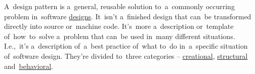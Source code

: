 \label{designpatterns}
A~design pattern is a~general, reusable solution to~a~commonly occurring problem in~software \hyperref[architecturedesign]{designs}.
It~isn't a~finished design that can~be transformed directly into source or~machine code.
It's~more a~description or~template of~how~to~solve a~problem that can~be used in~many different situations.
I.e.,~it's a~description of~a~best practice of~what to~do in~a~specific situation of~software design.
They're divided to~three categories -- \hyperref[creationaldp]{creational}, \hyperref[structuraldp]{structural} and~\hyperref[behavioraldp]{behavioral}.

